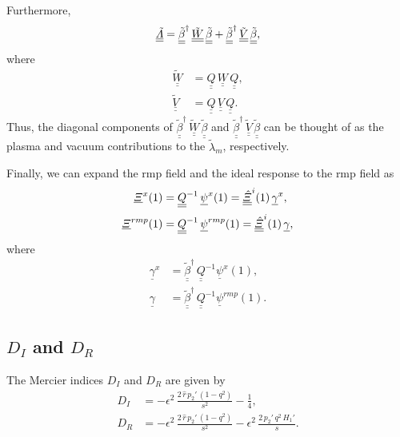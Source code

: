 \documentclass[12pt,prb,aps,notitlepage]{revtex4-1}
\begin{document}
 Furthermore,
\begin{equation}
\underline{\underline{\tilde{\mit\Lambda}}}=\underline{\underline{\tilde{\beta}}}^\dag\,\underline{\underline{\tilde{W}}}\,\underline{\underline{\tilde{\beta}}}
+\underline{\underline{\tilde{\beta}}}^\dag\,\underline{\underline{\tilde{V}}}\,\underline{\underline{\tilde{\beta}}},
\end{equation}
where
\begin{align}
\underline{\underline{\tilde{W}}}&= \underline{\underline{Q}}\,\underline{\underline{W}}\,\underline{\underline{Q}},\\[0.5ex]
\underline{\underline{\tilde{V}}}&= \underline{\underline{Q}}\,\underline{\underline{V}}\,\underline{\underline{Q}}.
\end{align}
Thus, the diagonal components of $\underline{\underline{\tilde{\beta}}}^\dag\,\underline{\underline{\tilde{W}}}\,\underline{\underline{\tilde{\beta}}}$ and 
$\underline{\underline{\tilde{\beta}}}^\dag\,\underline{\underline{\tilde{V}}}\,\underline{\underline{\tilde{\beta}}}$ can be thought of as the
plasma and vacuum contributions to the $\tilde{\lambda}_m$, respectively. 

Finally, we can expand the rmp field and the ideal response to the rmp field as
\begin{align}
\underline{\mit\Xi}^x(1)&=\underline{\underline{Q}}^{-1}\,\underline{\psi}^x(1) =\underline{\underline{\hat{\mit\Xi}}}^i(1)\,\underline{\gamma}^x,\\[0.5ex]
\underline{\mit\Xi}^{rmp}(1) &=\underline{\underline{Q}}^{-1}\,\underline{\psi}^{rmp}(1) =\underline{\underline{\hat{\mit\Xi}}}^i(1)\,\underline{\gamma},
\end{align}
where 
\begin{align}
\underline{\gamma}^x&= \underline{\underline{\tilde{\beta}}}^\dag\,\underline{\underline{Q}}^{-1}\underline{\psi}^x(1),\\[0.5ex]
\underline{\gamma}&= \underline{\underline{\tilde{\beta}}}^\dag\,\underline{\underline{Q}}^{-1}\underline{\psi}^{rmp}(1).
\end{align}

\subsection{$D_I$ and $D_R$}
The Mercier indices $D_I$ and $D_R$ are given by
\begin{align}
D_I &= - \epsilon^2\,\frac{2\,\hat{r}\,p_2'\,(1-q^2)}{s^2} -\frac{1}{4},\\[0.5ex]
D_R &= - \epsilon^2\,\frac{2\,\hat{r}\,p_2'\,(1-q^2)}{s^2} -\epsilon^2\,\frac{2\,p_2'\,q^2\,H_1'}{s}.
\end{align}
\end{document}
